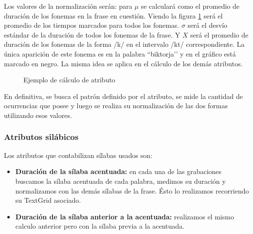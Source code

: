 Los valores de la normalización serán: para $\mu$ se calculará como el promedio de duración de los fonemas en la frase en cuestión. Viendo la figura \ref{ejemploAtribFon} será el promedio de los tiempos marcados para todos los fonemas. $\sigma$ será el desvío estándar de la duración de todos los fonemas de la frase. Y $X$ será el promedio de duración de los fonemas de la forma /k/ en el intervalo /kt/ correspondiente. La única aparición de este fonema es en la palabra ``biktorja’’ y en el gráfico está marcado en negro. La misma idea se aplica en el cálculo de los demás atributos.

\begin{figure}[H]
\centering
{}
\caption{Ejemplo de cálculo de atributo}
\label{ejemploAtribFon}
\end{figure}

En definitiva, se busca el patrón definido por el atributo, se mide la cantidad de ocurrencias que posee y luego se realiza su normalización de las dos formas utilizando esos valores. 

\subsubsection{Atributos silábicos}

Los atributos que contabilizan sílabas usados son:

\begin{itemize}
    \item \textbf{Duración de la sílaba acentuada:} en cada una de las grabaciones buscamos la sílaba acentuada de cada palabra, medimos su duración y normalizamos con las demás sílabas de la frase. Ésto lo realizamos recorriendo su TextGrid asociado.
    \item \textbf{Duración de la sílaba anterior a la acentuada:} realizamos el mismo calculo anterior pero con la sílaba previa a la acentuada. 
\end{itemize}

